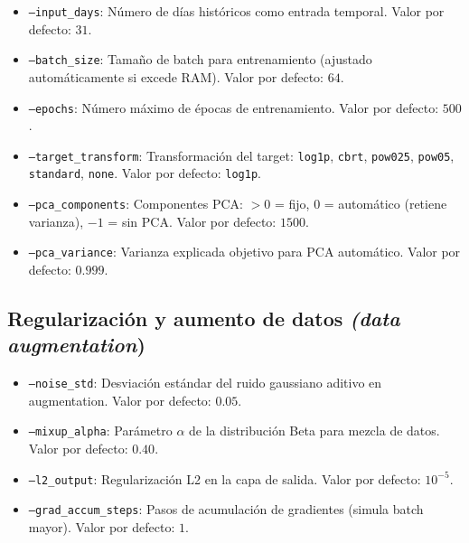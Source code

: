 \begin{itemize}
    \item \texttt{--input\_days}: Número de días históricos como entrada temporal. Valor por defecto: $31$.
    
    \item \texttt{--batch\_size}: Tamaño de batch para entrenamiento (ajustado automáticamente si excede RAM). Valor por defecto: $64$.
    
    \item \texttt{--epochs}: Número máximo de épocas de entrenamiento. Valor por defecto: $500$.
    
    \item \texttt{--target\_transform}: Transformación del target: \texttt{log1p}, \texttt{cbrt}, \texttt{pow025}, \texttt{pow05}, \texttt{standard}, \texttt{none}. Valor por defecto: \texttt{log1p}.
    
    \item \texttt{--pca\_components}: Componentes PCA: $>0$ = fijo, $0$ = automático (retiene varianza), $-1$ = sin PCA. Valor por defecto: $1500$.
    
    \item \texttt{--pca\_variance}: Varianza explicada objetivo para PCA automático. Valor por defecto: $0.999$.
\end{itemize}

\subsection*{Regularización y aumento de datos \textit{(data augmentation})}

\begin{itemize}
    \item \texttt{--noise\_std}: Desviación estándar del ruido gaussiano aditivo en augmentation. Valor por defecto: $0.05$.
    
    \item \texttt{--mixup\_alpha}: Parámetro $\alpha$ de la distribución Beta para mezcla de datos. Valor por defecto: $0.40$.
    
    \item \texttt{--l2\_output}: Regularización L2 en la capa de salida. Valor por defecto: $10^{-5}$.
    
    \item \texttt{--grad\_accum\_steps}: Pasos de acumulación de gradientes (simula batch mayor). Valor por defecto: $1$.
\end{itemize}

